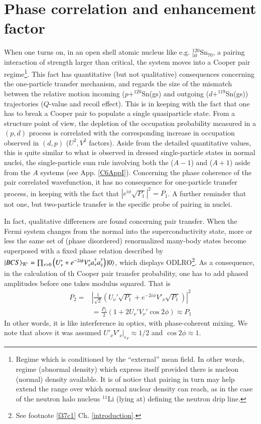 \section{Phase correlation and enhancement factor}\label{S4.3}
When one turns on, in an open shell atomic nucleus like e.g. $^{120}_{50}$Sn$_{70}$, a pairing interaction of strength larger than critical, the system moves into a Cooper pair regime\footnote{Regime which is conditioned by the ``external'' mean field. In other words, regime (abnormal density) which express itself provided there is nucleon (normal) density available. It is of notice that pairing in turn may help extend the range over which normal nuclear density can reach, as in the case of the neutron halo nucleus $^{11}$Li (lying at) defining  the neutron drip line.}. This fact has quantitative (but not qualitative)  consequences concerning the one-particle transfer mechanism,  and regards the size of the mismatch between the relative motion incoming ($p+^{120}$Sn(gs) and outgoing ($d+^{119}$Sn(gs)) trajectories ($Q$-value and recoil effect). This is in keeping with the fact that one has to break a Cooper pair to populate a single  quasiparticle state. From a structure point of view, the depletion of the occupation probability measured in a $(p,d)$ process is correlated with the corresponding increase in occupation observed in $(d,p)$ ($U^2,V^2$ factors). Aside  from the detailed quantitative values, this is quite similar to what is observed in dressed single-particle states in normal nuclei, the single-particle sum rule involving both the ($A-1$) and ($A+1$) aside from the $A$ systems (see App. \ref{C6AppI}). Concerning the phase coherence of the pair correlated wavefunction, it has no consequence for one-particle transfer process, in keeping with the fact that $|e^{i\phi}\sqrt{P_1}|^2=P_1$. A further reminder  that not one, but two-particle transfer is the specific probe of pairing in nuclei.


In fact, qualitative differences are found concerning pair transfer.  When the Fermi system changes from the normal into the superconductivity state, more or less the same set of (phase disordered) renormalized many-body states  become superposed with a fixed phase relation described by\\ $|{BCS} \rangle_{\mathcal K'}=\prod_{\nu>0}\left(U'_\nu+e^{-2i\phi} V'_\nu a_\nu^\dagger a^\dagger_{\tilde\nu}\right)|{0} \rangle$, which displays ODLRO\footnote{See footnote \ref{f37c1} Ch. \ref{introduction}.}. As a consequence, in the calculation of th Cooper pair transfer probability, one has to add phased amplitudes before one takes modulus squared. That is
\begin{align}\label{eq3.2.19}
\nonumber P_2=&\left|\frac{1}{\sqrt{2}}\left(U_\nu'\sqrt{P_1}+e^{-2i\phi}V'_\nu\sqrt{P_1}\right)\right|^2\\
&=\frac{P_1}{2}  \left(1+2U_\nu'V_\nu'\cos2\phi\right)\approx P_1
\end{align}
In other words, it is like interference in optics, with phase-coherent mixing. We note that above it was assumed $U'_\nu V'_\nu|_{\epsilon_F}\approx1/2$ and $\cos2\phi\approx1$.
 
